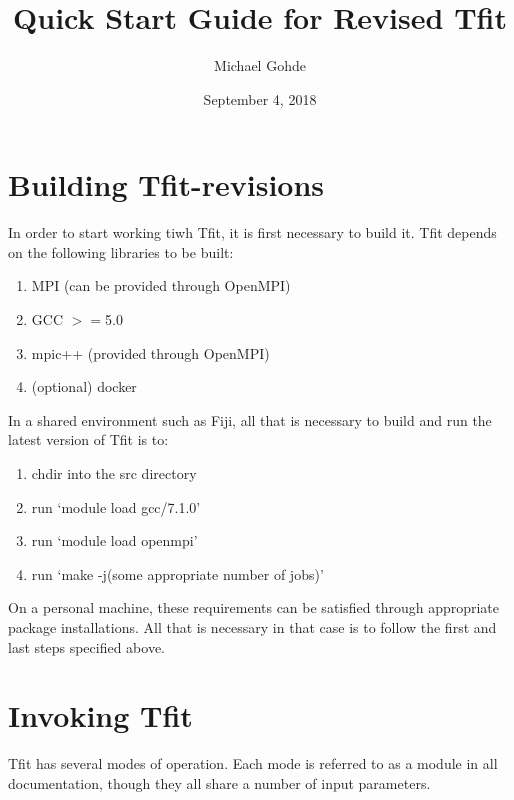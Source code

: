 \documentclass[12pt,letterpaper]{article}
\begin{document}
\title{Quick Start Guide for Revised Tfit}
\author{Michael Gohde}
\date{September 4, 2018}
\maketitle


\section{Building Tfit-revisions}
In order to start working tiwh Tfit, it is first necessary to build it. Tfit depends on the following libraries to be built:

\begin{enumerate}
\item MPI (can be provided through OpenMPI)
\item GCC $>=$5.0
\item mpic++ (provided through OpenMPI)
\item (optional) docker
\end{enumerate}

In a shared environment such as Fiji, all that is necessary to build and run the latest version of Tfit is to:
\begin{enumerate}
\item chdir into the src directory
\item run `module load gcc/7.1.0'
\item run `module load openmpi'
\item run `make -j(some appropriate number of jobs)'
\end{enumerate}

On a personal machine, these requirements can be satisfied through appropriate package installations. All that is necessary in that case is to follow the first and last steps specified above.

\section{Invoking Tfit}
Tfit has several modes of operation. Each mode is referred to as a module in all documentation, though they all share a number of input parameters. 
\end{document}
